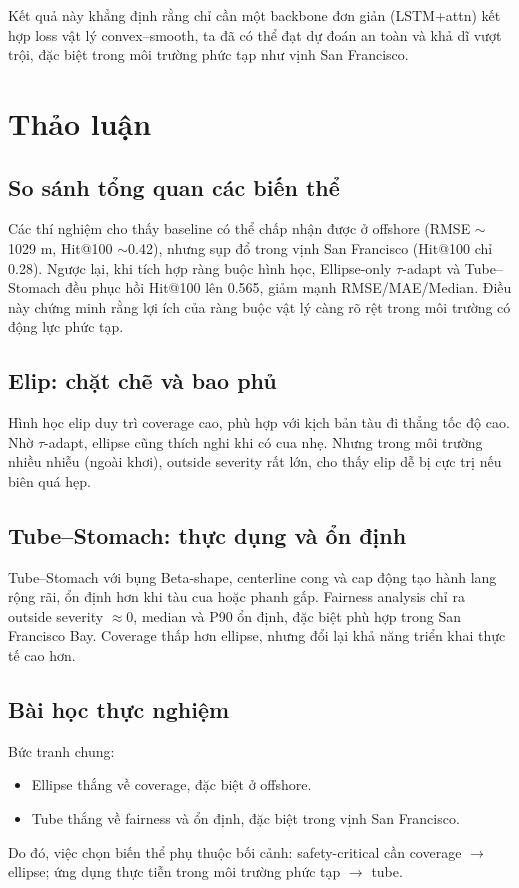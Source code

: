 \documentclass{IEEEtran}
\begin{document}
Kết quả này khẳng định rằng chỉ cần một backbone đơn giản (LSTM+attn) 
kết hợp loss vật lý convex--smooth, 
ta đã có thể đạt dự đoán an toàn và khả dĩ vượt trội, 
đặc biệt trong môi trường phức tạp như vịnh San Francisco.

\section{Thảo luận}

\subsection{So sánh tổng quan các biến thể}
Các thí nghiệm cho thấy baseline có thể chấp nhận được ở offshore (RMSE $\sim$1029 m, Hit@100 $\sim$0.42), 
nhưng sụp đổ trong vịnh San Francisco (Hit@100 chỉ 0.28). 
Ngược lại, khi tích hợp ràng buộc hình học, 
Ellipse-only $\tau$-adapt và Tube--Stomach đều phục hồi Hit@100 lên 0.565, 
giảm mạnh RMSE/MAE/Median. 
Điều này chứng minh rằng lợi ích của ràng buộc vật lý càng rõ rệt trong môi trường có động lực phức tạp.

\subsection{Elip: chặt chẽ và bao phủ}
Hình học elip duy trì coverage cao, phù hợp với kịch bản tàu đi thẳng tốc độ cao. 
Nhờ $\tau$-adapt, ellipse cũng thích nghi khi có cua nhẹ. 
Nhưng trong môi trường nhiều nhiễu (ngoài khơi), outside severity rất lớn, 
cho thấy elip dễ bị cực trị nếu biên quá hẹp.

\subsection{Tube--Stomach: thực dụng và ổn định}
Tube--Stomach với bụng Beta-shape, centerline cong và cap động 
tạo hành lang rộng rãi, ổn định hơn khi tàu cua hoặc phanh gấp. 
Fairness analysis chỉ ra outside severity $\approx$0, 
median và P90 ổn định, đặc biệt phù hợp trong San Francisco Bay. 
Coverage thấp hơn ellipse, nhưng đổi lại khả năng triển khai thực tế cao hơn.

\subsection{Bài học thực nghiệm}
Bức tranh chung:
\begin{itemize}
  \item Ellipse thắng về coverage, đặc biệt ở offshore.
  \item Tube thắng về fairness và ổn định, đặc biệt trong vịnh San Francisco.
\end{itemize}
Do đó, việc chọn biến thể phụ thuộc bối cảnh:  
safety-critical cần coverage $\to$ ellipse;  
ứng dụng thực tiễn trong môi trường phức tạp $\to$ tube.
\end{document}
